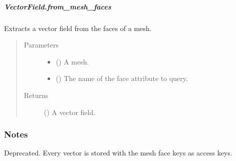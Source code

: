 \documentclass[letterpaper,10pt,english]{sphinxmanual}
\begin{document}
\begin{fulllineitems}
\begin{fulllineitems}
\end{fulllineitems}



\subparagraph{VectorField.from\_mesh\_faces}
\label{\detokenize{api/generated/directional_clustering.fields.VectorField.from_mesh_faces:vectorfield-from-mesh-faces}}\label{\detokenize{api/generated/directional_clustering.fields.VectorField.from_mesh_faces::doc}}

\begin{fulllineitems}
\label{\detokenize{api/generated/directional_clustering.fields.VectorField.from_mesh_faces:directional_clustering.fields.VectorField.from_mesh_faces}}
Extracts a vector field from the faces of a mesh.
\begin{quote}\begin{description}
\item[{Parameters}] \leavevmode\begin{itemize}
\item {} 
 () \textendash{} A mesh.

\item {} 
 () \textendash{} The name of the face attribute to query.

\end{itemize}

\item[{Returns}] \leavevmode
{} () \textendash{} A vector field.

\end{description}\end{quote}
\subsubsection*{Notes}

Deprecated.
Every vector is stored with the mesh face keys as access keys.

\end{fulllineitems}




\end{fulllineitems}
\end{document}
